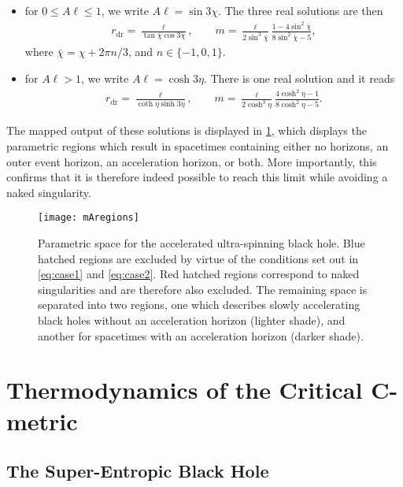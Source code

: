 \documentclass[
twoside,
openright,
frontopenright
]{dmathesis}
\newcommand{\dr}{\mathrm{dr}}
\begin{document}
\begin{itemize}
\item for $0\leqslant A\ell \leqslant 1$, we write $A\ell=\sin 3\chi$. The three
  real solutions are then
\begin{align}
r_\dr = \frac{\ell}{\tan\bar{\chi}\cos3\bar{\chi}}, \qquad m =
  \frac{\ell}{2\sin^3\bar{\chi}}\frac{1-4\sin^2\bar{\chi}}{8\sin^2\bar{\chi}-5},
\end{align}
where $\bar{\chi} = \chi + 2\pi n/3$, and $n \in \{-1,0,1\}$.
\item for $A\ell > 1$, we write $A\ell=\cosh 3\eta$. There is one real solution
  and it reads
\begin{align}
r_\dr = \frac{\ell}{\coth\eta\sinh 3\eta}, \qquad m =
  \frac{\ell}{2\cosh^3\eta}\frac{4\cosh^2\eta-1}{8\cosh^2\eta-5}. 
\end{align}
\end{itemize}

The mapped output of these solutions is displayed in \cref{fig:horroots}, which
displays the parametric regions which result in spacetimes containing either no
horizons, an outer event horizon, an acceleration horizon, or both. More
importantly, this confirms that it is therefore indeed possible to reach this
limit while avoiding a naked singularity.
 
\begin{figure}
  \centering
  \texttt{[image: mAregions]}
  \caption{\label{fig:horroots}Parametric space for the accelerated ultra-spinning
    black hole. Blue hatched regions are excluded by virtue of the conditions set
    out in \cref{eq:case1} and \cref{eq:case2}. Red hatched regions correspond to
    naked singularities and are therefore also excluded. The remaining space is
    separated into two regions, one which describes slowly accelerating black holes
    without an acceleration horizon (lighter shade), and another for spacetimes with
    an acceleration horizon (darker shade).}
\end{figure}

\section{Thermodynamics of the Critical C-metric}

\subsection{The Super-Entropic Black Hole}
\label{sec:uskerr}
\end{document}
